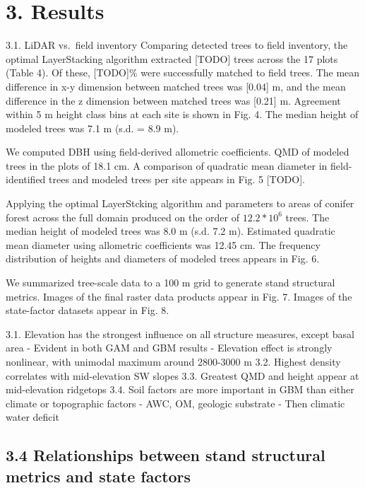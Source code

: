 \documentclass[
  12pt,
]{article}
\begin{document}
\section{3. Results}\label{results}

3.1. LiDAR vs.~field inventory Comparing detected trees to field
inventory, the optimal LayerStacking algorithm extracted {[}TODO{]}
trees across the 17 plots (Table 4). Of these, {[}TODO{]}\% were
successfully matched to field trees. The mean difference in x-y
dimension between matched trees was {[}0.04{]} m, and the mean
difference in the z dimension between matched trees was {[}0.21{]} m.
Agreement within 5 m height class bins at each site is shown in Fig. 4.
The median height of modeled trees was 7.1 m (s.d. = 8.9 m).

We computed DBH using field-derived allometric coefficients. QMD of
modeled trees in the plots of 18.1 cm. A comparison of quadratic mean
diameter in field-identified trees and modeled trees per site appears in
Fig. 5 {[}TODO{]}.

Applying the optimal LayerStcking algorithm and parameters to areas of
conifer forest across the full domain produced on the order of
\(12.2*10^6\) trees. The median height of modeled trees was 8.0 m (s.d.
7.2 m). Estimated quadratic mean diameter using allometric coefficients
was 12.45 cm. The frequency distribution of heights and diameters of
modeled trees appears in Fig. 6.

We summarized tree-scale data to a 100 m grid to generate stand
structural metrics. Images of the final raster data products appear in
Fig. 7. Images of the state-factor datasets appear in Fig. 8.

3.1. Elevation has the strongest influence on all structure measures,
except basal area - Evident in both GAM and GBM results - Elevation
effect is strongly nonlinear, with unimodal maximum around 2800-3000 m
3.2. Highest density correlates with mid-elevation SW slopes 3.3.
Greatest QMD and height appear at mid-elevation ridgetops 3.4. Soil
factors are more important in GBM than either climate or topographic
factors - AWC, OM, geologic substrate - Then climatic water deficit

\subsection{3.4 Relationships between stand structural metrics and state
factors}\label{relationships-between-stand-structural-metrics-and-state-factors}
\end{document}
